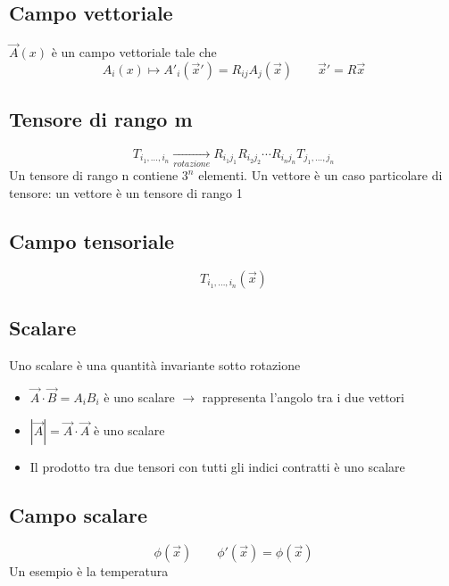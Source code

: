 \subsection*{Campo vettoriale}
$\vec{A}(x)$ è un campo vettoriale tale che 
\begin{equation*}
    A_i(x) \mapsto A'_i (\vec{x}') = R_{ij} A_j(\vec{x}) \qquad \vec{x}' = R \vec{x}
\end{equation*}

\subsection*{Tensore di rango m}

\begin{equation*}
    T_{i_1,\dots, i_n} \xrightarrow[rotazione]{} R_{i_1j_1}R_{i_2j_2}\dotsm R_{i_nj_n}T_{j_1,\dots,j_n}
\end{equation*}
Un tensore di rango n contiene $3^n$ elementi. Un vettore è un caso particolare di tensore: un vettore è un tensore di rango 1

\subsection*{Campo tensoriale}
\begin{equation*}
    T_{i_1,\dots, i_n}(\vec{x})
\end{equation*}

\subsection*{Scalare}

Uno scalare è una quantità invariante sotto rotazione
\begin{itemize}
    \item $\vec{A} \cdot \vec{B} = A_iB_i$ è uno scalare $\rightarrow$ rappresenta l'angolo tra i due vettori
    \item $|\vec{A}| = \vec{A} \cdot \vec{A}$ è uno scalare
    \item Il prodotto tra due tensori con tutti gli indici contratti è uno scalare
\end{itemize}

\subsection*{Campo scalare}
\begin{equation*}
    \phi(\vec{x}) \qquad \phi'(\vec{x}) = \phi(\vec{x})
\end{equation*}
Un esempio è la temperatura

